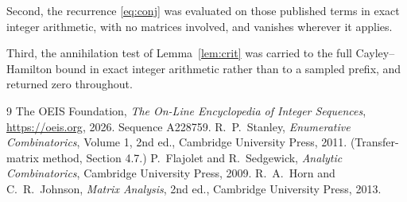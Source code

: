 \documentclass[11pt,a4paper]{article}
\theoremstyle{plain}
\theoremstyle{definition}
\begin{document}
Second, the recurrence \eqref{eq:conj} was evaluated on those published terms in exact
integer arithmetic, with no matrices involved, and vanishes wherever it applies.

Third, the annihilation test of Lemma~\ref{lem:crit} was carried to the full
Cayley--Hamilton bound in exact integer arithmetic rather than to a sampled prefix, and
returned zero throughout.

\begin{thebibliography}{9}
 The OEIS Foundation, \emph{The On-Line Encyclopedia of Integer
Sequences}, \url{https://oeis.org}, 2026. Sequence A228759.
 R.~P.~Stanley, \emph{Enumerative Combinatorics}, Volume 1, 2nd ed.,
Cambridge University Press, 2011. (Transfer-matrix method, Section 4.7.)
 P.~Flajolet and R.~Sedgewick, \emph{Analytic Combinatorics}, Cambridge
University Press, 2009.
 R.~A.~Horn and C.~R.~Johnson, \emph{Matrix Analysis}, 2nd ed., Cambridge
University Press, 2013.
\end{thebibliography}
\end{document}
